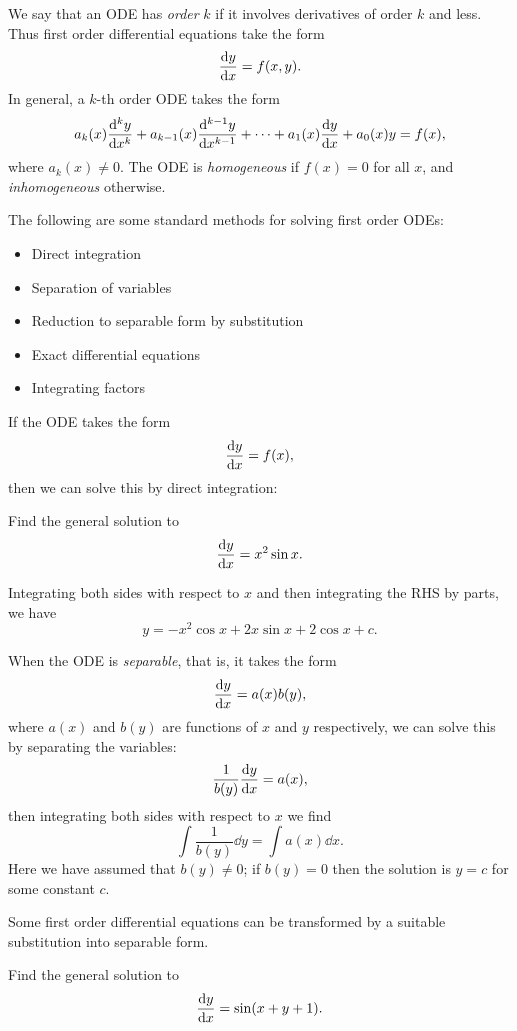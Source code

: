 We say that an ODE has \emph{order} $k$ if it involves derivatives of order $k$ and less. Thus first order differential equations take the form
\[\dv{y}{x}=f(x,y).\]
In general, a $k$-th order ODE takes the form
\[a_k(x)\dv[k]{y}{x}+a_{k-1}(x)\dv[k-1]{y}{x}+\cdots+a_1(x)\dv{y}{x}+a_0(x)y=f(x),\]
where $a_k(x)\neq0$. The ODE is \emph{homogeneous} if $f(x)=0$ for all $x$, and \emph{inhomogeneous} otherwise. 

The following are some standard methods for solving first order ODEs:
\begin{itemize}
\item Direct integration
\item Separation of variables
\item Reduction to separable form by substitution
\item Exact differential equations
\item Integrating factors
\end{itemize}

If the ODE takes the form
\[\dv{y}{x}=f(x),\]
then we can solve this by direct integration:

\begin{exercise}
Find the general solution to
\[\dv{y}{x}=x^2\sin x.\]
\end{exercise}

\begin{solution}
Integrating both sides with respect to $x$ and then integrating the RHS by parts, we have
\[y=-x^2\cos x+2x\sin x+2\cos x+c.\]
\end{solution}

When the ODE is \emph{separable}, that is, it takes the form
\[\dv{y}{x}=a(x)b(y),\]
where $a(x)$ and $b(y)$ are functions of $x$ and $y$ respectively, we can solve this by separating the variables:
\[\frac{1}{b(y)}\dv{y}{x}=a(x),\]
then integrating both sides with respect to $x$ we find
\[\int\frac{1}{b(y)}\dd{y}=\int a(x)\dd{x}.\]
Here we have assumed that $b(y)\neq0$; if $b(y)=0$ then the solution is $y=c$ for some constant $c$.

Some first order differential equations can be transformed by a suitable substitution into separable form.

\begin{exercise}
Find the general solution to
\[\dv{y}{x}=\sin(x+y+1).\]
\end{exercise}

